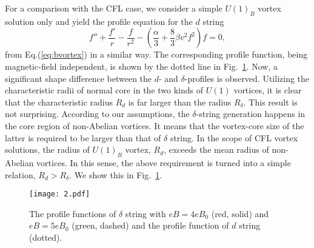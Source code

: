 \documentclass[prd, showpacs,nofootinbib,amsmath,amssymb]{revtex4}
\begin{document}
For a comparison with the CFL case, we consider a simple $U(1)_B$ vortex solution only and yield the
profile equation for the $d$ string
\begin{equation}
  \label{eq:bvortexprofile}
  f'' + \frac{f'}{r} -\frac{f}{r^2} - (\frac{\alpha}{3} + \frac{8}{3}\beta v^2 f^2)f=0,
\end{equation}
from Eq.(\ref{eq:bvortex}) in a similar way.
The corresponding profile function, being magnetic-field independent, is shown by the dotted line in
Fig.~\ref{fig:2}. Now, a significant shape difference between the $d$- and $\delta$-profiles is observed.
Utilizing the characteristic radii of normal core in the two kinds of $U(1)$ vortices, it is clear that
the characteristic radius $R_d$ is far larger than the radius $R_\delta$.
This result is not surprising. According to our assumptions, the $\delta$-string generation happens in
the core region of non-Abelian vortices. It means that the vortex-core size of the latter is required
to be larger than that of $\delta$ string. In the scope of CFL vortex solutions, the radius of $U(1)_B$ vortex, $R_d$, exceeds the mean radius of non-Abelian vortices. In this sense, the
above requirement is turned into a simple relation, $R_d > R_\delta$. We show this in Fig.~\ref{fig:2}.

\begin{figure}[ht]
\centering
\texttt{[image: 2.pdf]}
	\caption{The profile functions of $\delta$ string with $eB = 4eB_0$ (red, solid) and $eB =
    5 eB_0$ (green, dashed) and the profile function of $d$ string (dotted).}
	\label{fig:2}
\end{figure}
\end{document}
